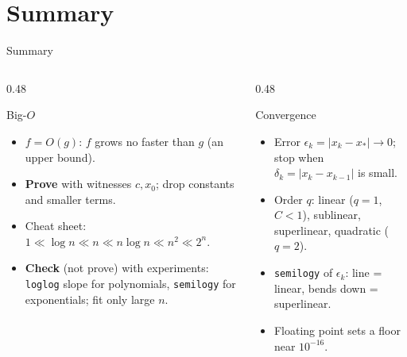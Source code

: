 \documentclass[aspectratio=169]{beamer}
\begin{document}
\section{Summary}

\begin{frame}{Summary}
\begin{columns}[T]
\begin{column}{0.48\textwidth}
\begin{block}{Big-$O$}
\footnotesize
\begin{itemize}
  \item $f = O(g)$: $f$ grows no faster than $g$ (an upper bound).
  \item \textbf{Prove} with witnesses $c, x_0$; drop constants and smaller terms.
  \item Cheat sheet: $1 \ll \log n \ll n \ll n\log n \ll n^2 \ll 2^n$.
  \item \textbf{Check} (not prove) with experiments: \texttt{loglog} slope for polynomials, \texttt{semilogy} for exponentials; fit only large $n$.
\end{itemize}
\end{block}
\end{column}
\begin{column}{0.48\textwidth}
\begin{block}{Convergence}
\footnotesize
\begin{itemize}
  \item Error $\epsilon_k = |x_k - x_\ast| \to 0$; stop when $\delta_k = |x_k - x_{k-1}|$ is small.
  \item Order $q$: linear ($q = 1$, $C < 1$), sublinear, superlinear, quadratic ($q = 2$).
  \item \texttt{semilogy} of $\epsilon_k$: line = linear, bends down = superlinear.
  \item Floating point sets a floor near $10^{-16}$.
\end{itemize}
\end{block}
\end{column}
\end{columns}

\end{frame}
\end{document}
